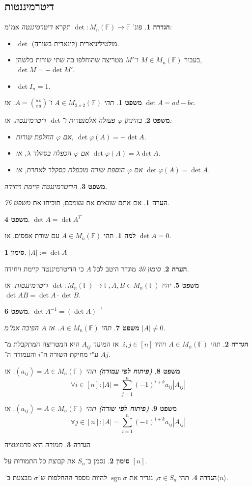 \documentclass[]{article}
\newcommand\ra    {\rangle}
\newcommand\la    {\langle}
\DeclareMathOperator{\sgn}    {sgn}
\newcommand\F         {\mathbb{F}}
\newcommand\co        {\colon}
\renewcommand\lg      {\lambda}
\newcommand\sg        {\sigma}
\newcommand\op    {^{-1}}
\renewcommand\phi     {\varphi}
\newtheorem{Theorem}{משפט}
\theoremstyle{definition}
\newtheorem{definition}{הגדרה}
\newtheorem{Lemma}{למה}
\newtheorem{Remark}{הערה}
\newtheorem{Notion}{סימון}
\newcommand\theo  [1] {\begin{Theorem}#1\end{Theorem}}
\newcommand\defi  [1] {\begin{definition}#1\end{definition}}
\newcommand\rmark [1] {\begin{Remark}#1\end{Remark}}
\newcommand\lem   [1] {\begin{Lemma}#1\end{Lemma}}
\newcommand\noti  [1] {\begin{Notion}#1\end{Notion}}
\begin{document}
\begin{multicols}{2}
		\section{דיטרמיננטות}
		\defi{פונ' $\det \co M_n(\F) \to \F$ תקרא \textit{דיטרמיננטה} אמ"מ: 
		\begin{itemize}
			\item $\det$ מולטיליניארית (לינארית בשורה). 
			\item בעבור $M \in M_n(\F)$ ו־$M'$ מטריצה שהוחלפו בה שתי שורות כלשהן, $\det M = -\det M'$. 
			\item $\det I_n = 1$. 
		\end{itemize}}
		\theo{תהי $A \in M_{2 \times 2}(\F)$ ו־$A = \binom{a\, b}{c\, d}$. אז $\det A = ad - bc$. }
		\theo{בהינתן $\phi$ פעולה אלמנטרית ו־$\det$ דיטרמיננטה, אז: 
		\begin{itemize}
			\item אם $\phi$ החלפת שורות, $\det \phi (A) = - \det A$. 
			\item אם $\phi$ הכפלה בסקלר $\lg$, אז $\det \phi (A) = \lg \det A$. 
			\item אם $\phi$ הוספת שורה מוכפלת בסקלר לאחרת, אז $\det \phi (A) = \det A$. 
		\end{itemize}}
		\theo{הדיטרמיננטה קיימת ויחידה. }
		\rmark{אם אתם שונאים את עצמכם, תוכיחו את \textit{משפט 76}. }
		\theo{$\det A = \det A^T$}
		\lem{תהי $A \in M_n(\F)$ עם שורת אפסים. אז $\det A = 0$. }
		\noti{\hfil $|A| := \det A$}
		\rmark{\textit{סימון 20} מוגדר היטב לכל $A$ כי הדיטרמיננטה קיימת ויחידה. }
		\theo{יהיו $\det \co M_n(\F) \to \F, A, B \in M_n(\F)$ דיטרמיננטות. אז $\det AB = \det A \cdot \det B$. }
		\theo{\hfil $\det A\op = (\det A)\op$}
		\theo{תהי $A \in M_n(\F)$. אז $A$ הפיכה אמ"מ $|A| \neq 0$. }
		\defi{תהי $A \in M_n(\F)$ ויהיו $i, j \in [n]$. אז ה\textit{מינור} $A_{ij}$ היא המטריצה המתקבלת מ־$A$ ע"י מחיקת השורה ה־$i$ והעמודה ה־$j$. }
		\begin{Theorem}\textbf{\textit{(פיתוח לפי עמודה)}}
			תהי $(a_{ij}) = A \in M_n(\F)$. אז 
			\[ \forall i \in [n] \co |A| = \sum_{j = 1}^{n}(-1)^{i + k}a_{ij} |A_{ij}| \]
		\end{Theorem}
		\begin{Theorem}\textbf{\textit{(פיתוח לפי שורה)}}
			תהי $(a_{ij}) = A \in M_n(\F)$. אז 
			\[ \forall j \in [n] \co |A| = \sum_{i = 1}^{n}(-1)^{i + k}a_{ij} |A_{ij}| \]
		\end{Theorem}
		
		\defi{\textit{תמורה} היא פרמוטציה}
		\noti{נסמן ב־$S_n$ את קבוצת כל התמורות על $[n]$. }
		\defi{תהי $\sg \in S_n$, נגדיר את $\sgn \sg$ להיות מספר ההחלפות ש־$\sg$ מבצעת ב־$\la n \ra$. }
		

\end{multicols}
\end{document}
